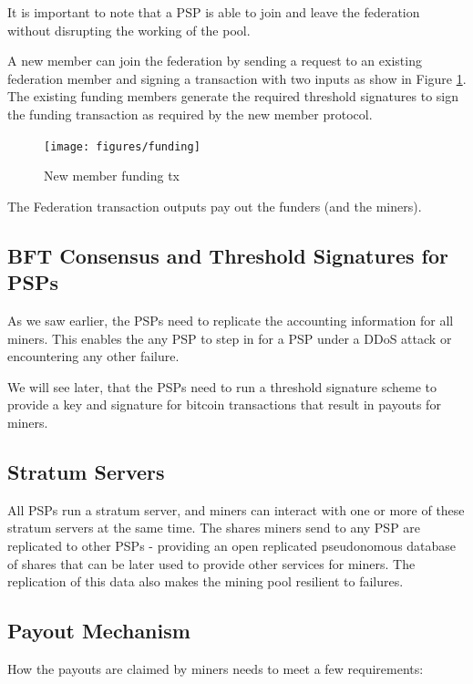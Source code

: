\documentclass{article}
\begin{document}
It is important to note that a PSP is able to join and leave the
federation without disrupting the working of the pool.

A new member can join the federation by sending a request to an
existing federation member and signing a transaction with two inputs
as show in Figure \ref{fig:funding}. The existing funding members
generate the required threshold signatures to sign the funding
transaction as required by the new member protocol.

\begin{figure}
  \begin{center}
    \texttt{[image: figures/funding]}
    \caption{New member funding tx}\label{fig:funding}
  \end{center}
  \label{fig:funding}
\end{figure}

The Federation transaction outputs pay out the funders (and the
miners).

\subsection{BFT Consensus and Threshold Signatures for PSPs}

As we saw earlier, the PSPs need to replicate the accounting
information for all miners. This enables the any PSP to step in for a
PSP under a DDoS attack or encountering any other failure.

We will see later, that the PSPs need to run a threshold signature
scheme to provide a key and signature for bitcoin transactions that
result in payouts for miners.

\subsection{Stratum Servers}

All PSPs run a stratum server, and miners can interact with one or
more of these stratum servers at the same time. The shares miners send
to any PSP are replicated to other PSPs - providing an open replicated
pseudonomous database of shares that can be later used to provide
other services for miners. The replication of this data also makes the
mining pool resilient to failures.

\subsection{Payout Mechanism}

How the payouts are claimed by miners needs to meet a few
requirements:
\end{document}
